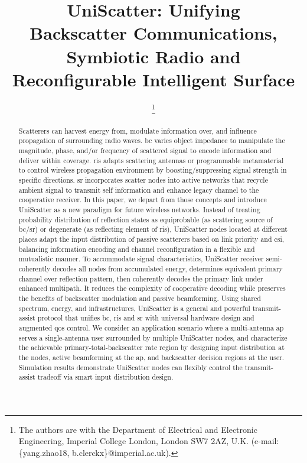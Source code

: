 \documentclass[journal]{IEEEtran}
\begin{document}
\title{UniScatter: Unifying\\Backscatter Communications, Symbiotic Radio and Reconfigurable Intelligent Surface}
\author{
	\thanks{
		The authors are with the Department of Electrical and Electronic Engineering, Imperial College London, London SW7 2AZ, U.K. (e-mail: \{yang.zhao18, b.clerckx\}@imperial.ac.uk).
	}
}
\maketitle

\begin{abstract}
	Scatterers can harvest energy from, modulate information over, and influence propagation of surrounding radio waves.
	\gls{bc} varies object impedance to manipulate the magnitude, phase, and/or frequency of scattered signal to encode information and deliver within coverage.
	\gls{ris} adapts scattering antennas or programmable metamaterial to control wireless propagation environment by boosting/suppressing signal strength in specific directions.
	\gls{sr} incorporates scatter nodes into active networks that recycle ambient signal to transmit self information and enhance legacy channel to the cooperative receiver.
	In this paper, we depart from those concepts and introduce UniScatter as a new paradigm for future wireless networks.
	Instead of treating probability distribution of reflection states as equiprobable (as scattering source of \gls{bc}/\gls{sr}) or degenerate (as reflecting element of \gls{ris}), UniScatter nodes located at different places adapt the input distribution of passive scatterers based on link priority and \gls{csi}, balancing information encoding and channel reconfiguration in a flexible and mutualistic manner.
	To accommodate signal characteristics, UniScatter receiver semi-coherently decodes all nodes from accumulated energy, determines equivalent primary channel over reflection pattern, then coherently decodes the primary link under enhanced multipath.
	It reduces the complexity of cooperative decoding while preserves the benefits of backscatter modulation and passive beamforming.
	Using shared spectrum, energy, and infrastructures, UniScatter is a general and powerful transmit-assist protocol that unifies \gls{bc}, \gls{ris} and \gls{sr} with universal hardware design and augmented \gls{qos} control.
	We consider an application scenario where a multi-antenna \gls{ap} serves a single-antenna user surrounded by multiple UniScatter nodes, and characterize the achievable primary-total-backscatter rate region by designing input distribution at the nodes, active beamforming at the \gls{ap}, and backscatter decision regions at the user.
	Simulation results demonstrate UniScatter nodes can flexibly control the transmit-assist tradeoff via smart input distribution design.
\end{abstract}
\end{document}
